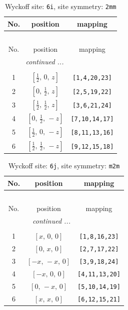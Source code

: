 \documentclass[fleqn,8pt]{jsarticle}
\begin{document}
\renewcommand{\arraystretch}{1.2}
\begin{longtable}{ccc}
\caption{Wyckoff site: {\tt 6i}, site symmetry: {\tt 2mm}}
 \\
 \hline \hline
No. & position & mapping \\ \hline \endfirsthead

\multicolumn{2}{l}{\tablename\ \thetable{}} \\
 \hline \hline
No. & position & mapping \\ \hline \endhead

 \hline \hline
\multicolumn{2}{r}{\footnotesize\it continued ...} \\ \endfoot

 \hline \hline
\multicolumn{2}{r}{} \\ \endlastfoot

1 & $\left[ \frac{1}{2},\, 0,\, z \right]$ & {\tt [1,4,20,23]} \\ \hline
2 & $\left[ 0,\, \frac{1}{2},\, z \right]$ & {\tt [2,5,19,22]} \\ \hline
3 & $\left[ \frac{1}{2},\, \frac{1}{2},\, z \right]$ & {\tt [3,6,21,24]} \\ \hline
4 & $\left[ 0,\, \frac{1}{2},\, - z \right]$ & {\tt [7,10,14,17]} \\ \hline
5 & $\left[ \frac{1}{2},\, 0,\, - z \right]$ & {\tt [8,11,13,16]} \\ \hline
6 & $\left[ \frac{1}{2},\, \frac{1}{2},\, - z \right]$ & {\tt [9,12,15,18]} \\
\end{longtable}
\renewcommand{\arraystretch}{1.2}
\begin{longtable}{ccc}
\caption{Wyckoff site: {\tt 6j}, site symmetry: {\tt m2m}}
 \\
 \hline \hline
No. & position & mapping \\ \hline \endfirsthead

\multicolumn{2}{l}{\tablename\ \thetable{}} \\
 \hline \hline
No. & position & mapping \\ \hline \endhead

 \hline \hline
\multicolumn{2}{r}{\footnotesize\it continued ...} \\ \endfoot

 \hline \hline
\multicolumn{2}{r}{} \\ \endlastfoot

1 & $\left[ x,\, 0,\, 0 \right]$ & {\tt [1,8,16,23]} \\ \hline
2 & $\left[ 0,\, x,\, 0 \right]$ & {\tt [2,7,17,22]} \\ \hline
3 & $\left[ - x,\, - x,\, 0 \right]$ & {\tt [3,9,18,24]} \\ \hline
4 & $\left[ - x,\, 0,\, 0 \right]$ & {\tt [4,11,13,20]} \\ \hline
5 & $\left[ 0,\, - x,\, 0 \right]$ & {\tt [5,10,14,19]} \\ \hline
6 & $\left[ x,\, x,\, 0 \right]$ & {\tt [6,12,15,21]} \\
\end{longtable}
\end{document}
